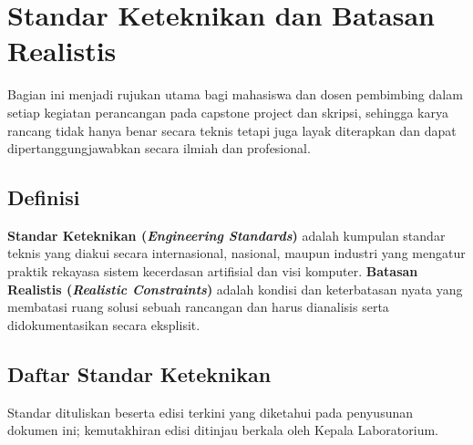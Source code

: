 \documentclass[12pt,a4paper]{report}
\begin{document}
\chapter{Standar Keteknikan dan Batasan Realistis}
\label{chap:standar}

Bagian ini menjadi rujukan utama bagi mahasiswa dan dosen pembimbing dalam setiap kegiatan perancangan pada capstone project dan skripsi, sehingga karya rancang tidak hanya benar secara teknis tetapi juga layak diterapkan dan dapat dipertanggungjawabkan secara il\-mi\-ah dan pro\-fe\-sio\-nal.

\section{Definisi}
\textbf{Standar Keteknikan (\emph{Engineering Standards})} adalah kumpulan standar teknis yang diakui secara internasional, nasional, maupun industri yang mengatur praktik rekayasa sistem kecerdasan artifisial dan visi komputer. \textbf{Batasan Realistis (\emph{Realistic Constraints})} adalah kondisi dan keterbatasan nyata yang membatasi ruang solusi sebuah rancangan dan harus dianalisis serta didokumentasikan secara eksplisit.

\section{Daftar Standar Keteknikan}
Standar dituliskan beserta edisi terkini yang diketahui pada penyusunan dokumen ini; kemutakhiran edisi ditinjau berkala oleh Kepala Laboratorium.
\end{document}

